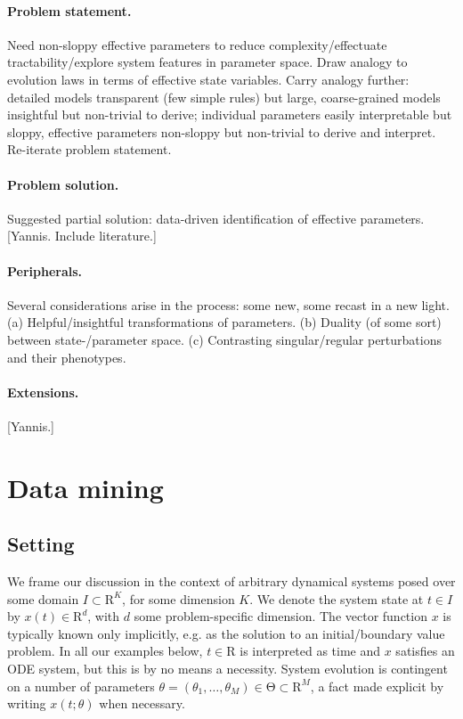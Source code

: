 \documentclass{article}
\newcommand{\p}{\theta}
\newcommand{\R}{\mathrm{R}}
\newcommand{\ps}{\mathrm{\Theta}}
\begin{document}
\paragraph{Problem statement.}
Need non-sloppy effective parameters
to reduce complexity/effectuate tractability/explore system features
in parameter space.
Draw analogy to evolution laws in terms of effective state variables.
Carry analogy further:
detailed models transparent (few simple rules) but large,
coarse-grained models insightful but non-trivial to derive;
individual parameters easily interpretable but sloppy,
effective parameters non-sloppy but non-trivial to derive and interpret.
Re-iterate problem statement.

\paragraph{Problem solution.}
Suggested partial solution: data-driven identification of effective parameters.
[Yannis. Include literature.]

\paragraph{Peripherals.}
Several considerations arise in the process:
some new, some recast in a new light.
(a) Helpful/insightful transformations of parameters.
(b) Duality (of some sort) between state-/parameter space.
(c) Contrasting singular/regular perturbations and their phenotypes.

\paragraph{Extensions.}
[Yannis.]



\section{Data mining}

\subsection{Setting}
%
We frame our discussion in the context of arbitrary dynamical systems
posed over some domain $I \subset \R^K$, for some dimension $K$.  We
denote the system state at $t \in I$ by $x(t) \in \R^d$, with $d$ some
problem-specific dimension.  The vector function $x$ is typically
known only implicitly, e.g. as the solution to an initial/boundary
value problem.  In all our examples below, $t\in\R$ is interpreted as
time and $x$ satisfies an ODE system, but this is by no means a
necessity.  System evolution is contingent on a number of parameters
$\p = (\p_1,\ldots,\p_M) \in \ps \subset \R^M$,
a fact made explicit by writing $x(t;\p)$ when necessary.\\
\end{document}

